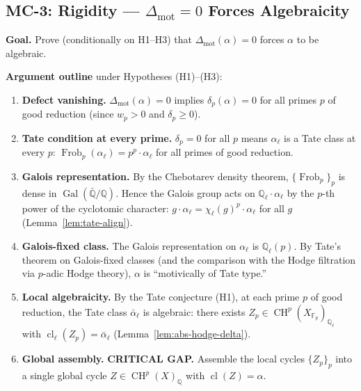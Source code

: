 \documentclass[11pt]{article}
\theoremstyle{definition}
\DeclareMathOperator{\cl}{cl}
\DeclareMathOperator{\Gal}{Gal}
\DeclareMathOperator{\Frob}{Frob}
\DeclareMathOperator{\CH}{CH}
\begin{document}
\subsection{MC-3: Rigidity --- $\Delta_{\mathrm{mot}} = 0$ Forces Algebraicity}
\label{sec:mc3}

\textbf{Goal.}  Prove (conditionally on H1--H3) that
$\Delta_{\mathrm{mot}}(\alpha) = 0$ forces $\alpha$ to be algebraic.

\medskip

\textbf{Argument outline} under Hypotheses (H1)--(H3):

\begin{enumerate}[label=\textbf{Step \arabic*.}, leftmargin=3cm]
  \item \textbf{Defect vanishing.}
    $\Delta_{\mathrm{mot}}(\alpha) = 0$ implies $\delta_p(\alpha) = 0$ for
    all primes $p$ of good reduction (since $w_p > 0$ and $\delta_p \geq 0$).

  \item \textbf{Tate condition at every prime.}
    $\delta_p = 0$ for all $p$ means $\alpha_\ell$ is a Tate class at every $p$:
    $\Frob_p(\alpha_\ell) = p^p \cdot \alpha_\ell$ for all primes of good reduction.

  \item \textbf{Galois representation.}
    By the Chebotarev density theorem, $\{\Frob_p\}_p$ is dense in
    $\Gal(\bar{\mathbb{Q}}/\mathbb{Q})$.  Hence the Galois group acts on
    $\mathbb{Q}_\ell \cdot \alpha_\ell$ by the $p$-th power of the
    cyclotomic character:
    $g \cdot \alpha_\ell = \chi_\ell(g)^p \cdot \alpha_\ell$ for all
    $g$ (Lemma~\ref{lem:tate-align}).

  \item \textbf{Galois-fixed class.}
    The Galois representation on $\alpha_\ell$ is $\mathbb{Q}_\ell(p)$.
    By Tate's theorem on Galois-fixed classes (and the comparison with
    the Hodge filtration via $p$-adic Hodge theory), $\alpha$ is
    ``motivically of Tate type.''

  \item \textbf{Local algebraicity.}
    By the Tate conjecture (H1), at each prime $p$ of good reduction,
    the Tate class $\bar{\alpha}_\ell$ is algebraic: there exists
    $Z_p \in \CH^p(X_{\mathbb{F}_p})_{\mathbb{Q}_\ell}$ with
    $\cl_\ell(Z_p) = \bar{\alpha}_\ell$
    (Lemma~\ref{lem:abs-hodge-delta}).

  \item \textbf{Global assembly.}
    \textbf{CRITICAL GAP.}
    Assemble the local cycles $\{Z_p\}_{p}$ into a single global cycle
    $Z \in \CH^p(X)_{\mathbb{Q}}$ with $\cl(Z) = \alpha$.


\end{enumerate}
\end{document}

